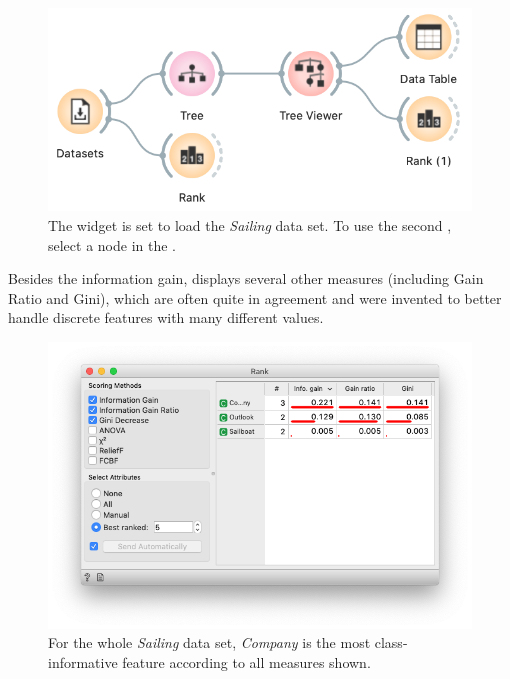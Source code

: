 \begin{figure}[h]
    \centering
    \includegraphics[scale=0.4]{graphics/ch-classification_trees/workflow-rank.png}
    \caption{The  widget is set to load the \textit{Sailing} data set. To use the second , select a node in the .}
\end{figure}

Besides the information gain,  displays several other measures (including Gain Ratio and Gini), which are often quite in agreement and were invented to better handle discrete features with many different values.

\begin{figure}[h]
    \centering
    \vspace{-0.2cm}
    \includegraphics[scale=0.4]{graphics/ch-classification_trees/rank.png}
    \caption{For the whole \textit{Sailing} data set, \textit{Company} is the most class-informative feature according to all measures shown.}
\end{figure}

\newpage

